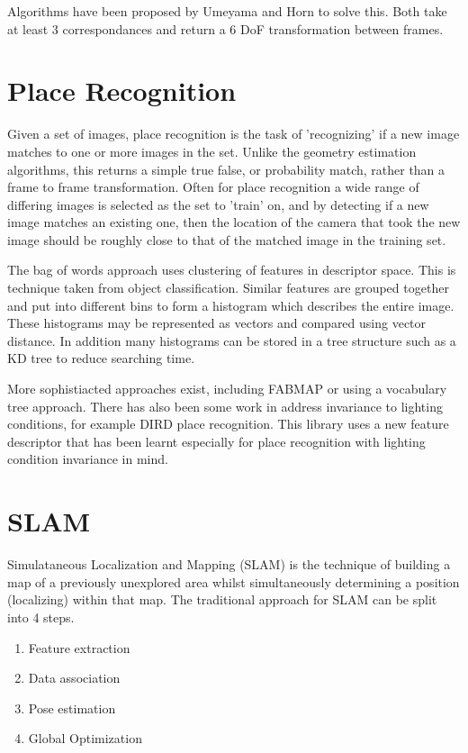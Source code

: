 Algorithms have been proposed by Umeyama and Horn to solve this.  Both take at least 3 correspondances and return a 6 DoF transformation between frames.


\section{Place Recognition}
\label{sec:bag_of_words}

Given a set of images, place recognition is the task of 'recognizing' if a new image matches to one or more images in the set.  Unlike the geometry estimation algorithms, this returns a simple true false, or probability match, rather than a frame to frame transformation.  Often for place recognition a wide range of differing images is selected as the set to 'train' on, and by detecting if a new image matches an existing one, then the location of the camera that took the new image should be roughly close to that of the matched image in the training set.

The bag of words approach uses clustering of features in descriptor space.  This is technique taken from object classification.  Similar features are grouped together and put into different bins to form a histogram which describes the entire image.  These histograms may be represented as vectors and compared using vector distance.  In addition many histograms can be stored in a tree structure such as a KD tree to reduce searching time.

More sophistiacted approaches exist, including FABMAP or using a vocabulary tree approach.  There has also been some work in address invariance to lighting conditions, for example DIRD place recognition.  This library uses a new feature descriptor that has been learnt especially for place recognition with lighting condition invariance in mind.

\section{SLAM}
\label{sec:slam}

Simulataneous Localization and Mapping (SLAM) is the technique of building a map of a previously
unexplored area whilst simultaneously determining a position (localizing) within that map.  The
traditional approach for SLAM can be split into 4 steps.
\begin{enumerate} \itemsep1pt \parskip0pt 
 \item Feature extraction
 \item Data association
 \item Pose estimation
 \item Global Optimization
\end{enumerate}

